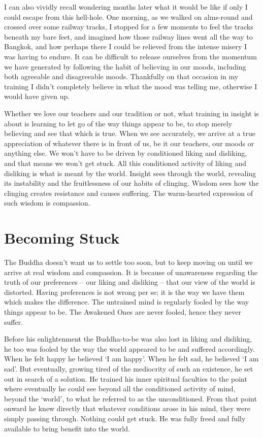 I can also vividly recall wondering months later what it would be like
if only I could escape from this hell-hole. One morning, as we walked on
alms-round and crossed over some railway tracks, I stopped for a few
moments to feel the tracks beneath my bare feet, and imagined how those
railway lines went all the way to Bangkok, and how perhaps there I could
be relieved from the intense misery I was having to endure. It can be
difficult to release ourselves from the momentum we have generated by
following the habit of believing in our moods, including both agreeable
and disagreeable moods. Thankfully on that occasion in my training I
didn’t completely believe in what the mood was telling me, otherwise I
would have given up.

Whether we love our teachers and our tradition or not, what training in
insight is about is learning to let go of the way things appear to be,
to stop merely believing and see that which is true. When we see
accurately, we arrive at a true appreciation of whatever there is in
front of us, be it our teachers, our moods or anything else. We won’t
have to be driven by conditioned liking and disliking, and that means we
won’t get stuck. All this conditioned activity of liking and disliking
is what is meant by the world. Insight sees through the world, revealing
its instability and the fruitlessness of our habits of clinging. Wisdom
sees how the clinging creates resistance and causes suffering. The
warm-hearted expression of such wisdom is compassion.

\section{Becoming Stuck}

The Buddha doesn’t want us to settle too soon, but to keep moving on
until we arrive at real wisdom and compassion. It is because of
unawareness regarding the truth of our preferences – our liking and
disliking – that our view of the world is distorted. Having preferences
is not wrong per se; it is the way we have them which makes the
difference. The untrained mind is regularly fooled by the way things
appear to be. The Awakened Ones are never fooled, hence they never
suffer.

Before his enlightenment the Buddha-to-be was also lost in liking and
disliking, he too was fooled by the way the world appeared to be and
suffered accordingly. When he felt happy he believed ‘I am happy’. When
he felt sad, he believed ‘I am sad’. But eventually, growing tired of
the mediocrity of such an existence, he set out in search of a solution.
He trained his inner spiritual faculties to the point where eventually
he could see beyond all the conditioned activity of mind, beyond the
‘world’, to what he referred to as the unconditioned. From that point
onward he knew directly that whatever conditions arose in his mind, they
were simply passing through. Nothing could get stuck. He was fully freed
and fully available to bring benefit into the world.

